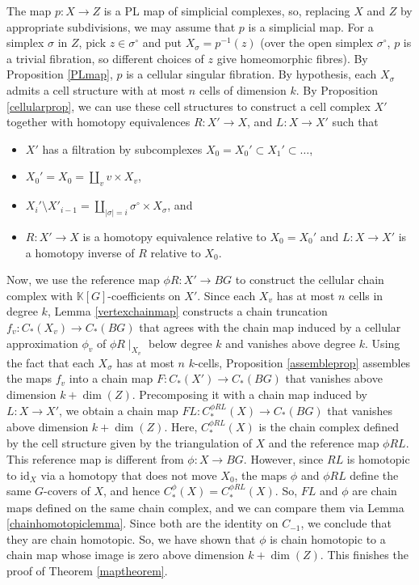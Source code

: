 \documentclass[11pt,letterpaper]{amsart}
\begin{document}
The map $p:X\rightarrow Z$ is a PL map of simplicial complexes, so, replacing $X$ and $Z$ by appropriate subdivisions, we may assume that $p$ is a simplicial map. For a simplex $\sigma$ in $Z$, pick $z\in\sigma^\circ$ and put $X_\sigma=p^{-1}(z)$ (over the open simplex $\sigma^\circ$, $p$ is a trivial fibration, so different choices of $z$ give homeomorphic fibres). By Proposition \ref{PLmap}, $p$ is a cellular singular fibration. By hypothesis, each $X_{\sigma}$ admits a cell structure with at most $n$ cells of dimension $k$. By Proposition \ref{cellularprop}, we can use these cell structures to construct a cell complex $X'$ together with homotopy equivalences $R:X'\rightarrow X$, and $L:X\rightarrow X'$ such that 
\begin{itemize}
\item 
$X'$ has a filtration by subcomplexes $X_0=X_0'\subset X_1'\subset\dots$,
\item
$X_0'=X_0=\coprod_{v}v\times X_v$,
\item 
$X_i'\setminus X'_{i-1}=\coprod_{|\sigma|=i}\sigma^{\circ}\times X_{\sigma}$, and
\item
$R:X'\rightarrow X$ is a homotopy equivalence relative to $X_0=X_0'$ and $L:X\rightarrow X'$ is a homotopy inverse of $R$ relative to $X_0$. 
\end{itemize}
Now, we use the reference map $\phi R:X'\rightarrow BG$ to construct the cellular chain complex with $\mathbb K[G]$-coefficients on $X'$. Since each $X_v$ has at most $n$ cells in degree $k$, Lemma \ref{vertexchainmap} constructs a chain truncation $f_v:C_*(X_v)\rightarrow C_*(BG)$ that agrees with the chain map induced by a cellular approximation $\phi_v$ of $\phi R\mid _{X_v}$ below degree $k$ and vanishes above degree $k$. Using the fact that each $X_{\sigma}$ has at most $n$ $k$-cells, Proposition \ref{assembleprop} assembles the maps $f_v$ into a chain map $F:C_*(X')\rightarrow C_*(BG)$ that vanishes above dimension $k+\dim(Z)$. Precomposing it with a chain map induced by $L:X\rightarrow X'$, we obtain a chain map $FL:C^{\phi RL}_*(X)\rightarrow C_*(BG)$ that vanishes above dimension $k+\dim(Z)$. 
Here, $C^{\phi RL}_*(X)$ is the chain complex defined by the cell structure given by the triangulation of $X$ and the reference map $\phi RL$. This reference map is different from $\phi:X\rightarrow BG$. However, since $RL$ is homotopic to $\mathrm{id}_X$ via a homotopy that does not move $X_0$, the maps $\phi$ and $\phi RL$ define the same $G$-covers of $X$, and hence $C^{\phi}_*(X)=C_*^{\phi RL}(X)$. So, $FL$ and $\phi$ are chain maps defined on the same chain complex, and we can compare them via Lemma \ref{chainhomotopiclemma}. Since both are the identity on $C_{-1}$, we conclude that they are chain homotopic. So, we have shown that $\phi$ is chain homotopic to a chain map whose image is zero above dimension $k+\dim(Z)$. This finishes the proof of Theorem \ref{maptheorem}.  
\end{document}
